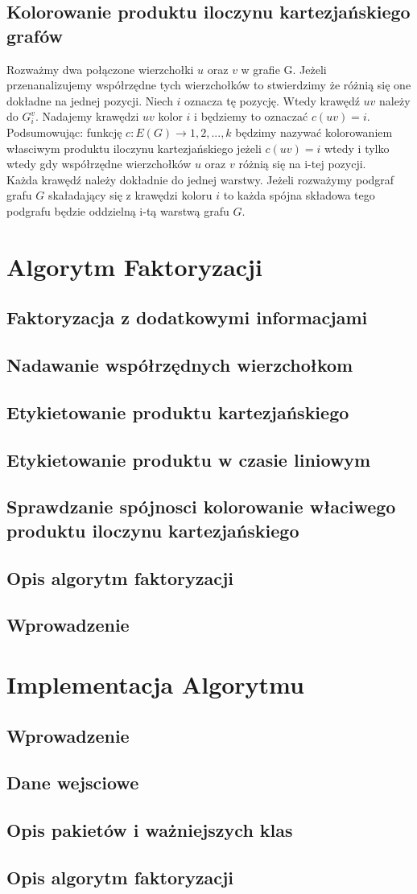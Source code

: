 \documentclass[12pt,a4paper,titlepage]{article}
\begin{document}
\subsection{Kolorowanie produktu iloczynu kartezjańskiego grafów}
Rozważmy dwa połączone wierzchołki $u$ oraz $v$ w grafie G. Jeżeli przenanalizujemy współrzędne tych wierzchołków to stwierdzimy że różnią się one dokładne na jednej pozycji. Niech $i$ oznacza tę pozycję. Wtedy krawędź $uv$ należy do $G_i^v$. Nadajemy krawędzi $uv$ kolor $i$ i będziemy to oznaczać $c(uv) = i$. Podsumowując: funkcję $c: E(G) \rightarrow {1,2,...,k}$ będzimy nazywać kolorowaniem własciwym produktu iloczynu kartezjańskiego jeżeli $c(uv) = i $ wtedy i tylko wtedy gdy współrzędne wierzchołków $u$ oraz $v$ różnią się na i-tej pozycji.\\
Każda krawędź należy dokładnie do jednej warstwy. Jeżeli rozważymy podgraf grafu $G$ skaładający się z krawędzi koloru $i$ to każda spójna składowa tego podgrafu będzie oddzielną i-tą warstwą grafu $G$.
\section{Algorytm Faktoryzacji}
\subsection{Faktoryzacja z dodatkowymi informacjami}
\subsection{Nadawanie współrzędnych wierzchołkom}
\subsection{Etykietowanie produktu kartezjańskiego}
\subsection{Etykietowanie produktu w czasie liniowym}
\subsection{Sprawdzanie spójnosci kolorowanie właciwego produktu iloczynu kartezjańskiego}
\subsection{Opis algorytm faktoryzacji}
\subsection{Wprowadzenie}
\section{Implementacja Algorytmu}
\subsection{Wprowadzenie}
\subsection{Dane wejsciowe}
\subsection{Opis pakietów i ważniejszych  klas}
\subsection{Opis algorytm faktoryzacji}
\end{document}

